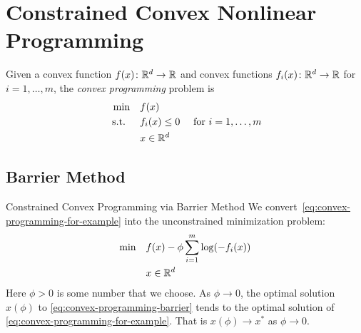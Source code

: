 \documentclass[../open-optimization/open-optimization.tex]{subfiles}
\begin{document}
\section{Constrained Convex Nonlinear Programming}
Given a convex function $f(x)\colon {\mathbb{R}}^d \to {\mathbb{R}}$ and convex functions $f_i(x)\colon {\mathbb{R}}^d \to {\mathbb{R}}$ for $i=1, \dots, m$,  the \emph{convex programming} problem is
\begin{equation}
\label{eq:convex-programming-for-example}
\begin{split}
\min \quad & f(x)\\
\text{ s.t. }  \quad & f_i(x) \leq 0  \quad  \text{ for } i=1, \dots, m\\
& x \in {\mathbb{R}}^d
\end{split}
\end{equation}

\subsection{Barrier Method}
\begin{general}{Constrained Convex Programming via Barrier Method}{}
We convert~\eqref{eq:convex-programming-for-example} into the unconstrained minimization problem:
\begin{equation}
\label{eq:convex-programming-barrier}
\begin{split}
\min \quad & f(x) - \phi \sum_{i=1}^m \log(-f_i(x)) \\
& x \in {\mathbb{R}}^d
\end{split}
\end{equation}
Here $\phi > 0$ is some number that we choose.  As $\phi \to 0$, the optimal solution $x(\phi)$ to \eqref{eq:convex-programming-barrier} tends to the optimal solution of \eqref{eq:convex-programming-for-example}.  That is $x(\phi) \to x^*$ as $\phi \to 0$.
\end{general}
\end{document}
